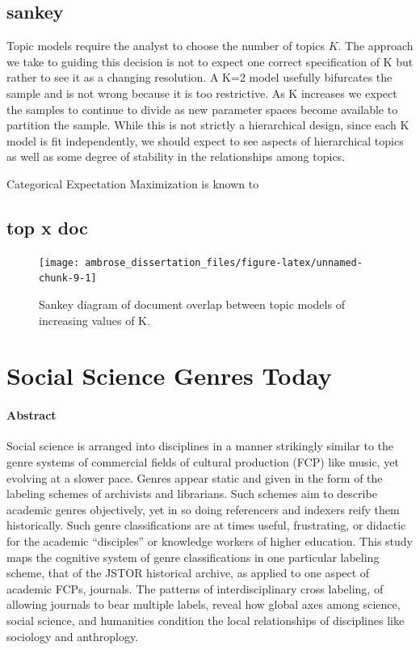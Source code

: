 \documentclass[]{book}
\theoremstyle{definition}
\theoremstyle{definition}
\theoremstyle{definition}
\theoremstyle{remark}
\begin{document}
\hypertarget{sankey}{%
\section{sankey}\label{sankey}}

Topic models require the analyst to choose the number of topics \(K\).
The approach we take to guiding this decision is not to expect one
correct specification of K but rather to see it as a changing
resolution. A K=2 model usefully bifurcates the sample and is not wrong
because it is too restrictive. As K increases we expect the samples to
continue to divide as new parameter spaces become available to partition
the sample. While this is not strictly a hierarchical design, since each
K model is fit independently, we should expect to see aspects of
hierarchical topics as well as some degree of stability in the
relationships among topics.

Categorical Expectation Maximization is known to

\hypertarget{top-x-doc}{%
\section{top x doc}\label{top-x-doc}}

\begin{figure}

{\centering \texttt{[image: ambrose\_dissertation\_files/figure-latex/unnamed-chunk-9-1]} 

}

\caption{Sankey diagram of document overlap between topic models of increasing values of K.}\label{fig:unnamed-chunk-9}
\end{figure}

\hypertarget{gen}{%
\chapter{Social Science Genres Today}\label{gen}}

\hypertarget{abstract-1}{%
\subsubsection*{Abstract}\label{abstract-1}}


Social science is arranged into disciplines in a manner
strikingly similar to the genre systems of commercial fields of cultural
production (FCP) like music, yet evolving at a slower pace. Genres
appear static and given in the form of the labeling schemes of
archivists and librarians. Such schemes aim to describe academic genres
objectively, yet in so doing referencers and indexers reify them
historically. Such genre classifications are at times useful,
frustrating, or didactic for the academic ``disciples'' or knowledge
workers of higher education. This study maps the cognitive system of
genre classifications in one particular labeling scheme, that of the
JSTOR historical archive, as applied to one aspect of academic FCPs,
journals. The patterns of interdisciplinary cross labeling, of allowing
journals to bear multiple labels, reveal how global axes among science,
social science, and humanities condition the local relationships of
disciplines like sociology and anthroplogy.
\end{document}
